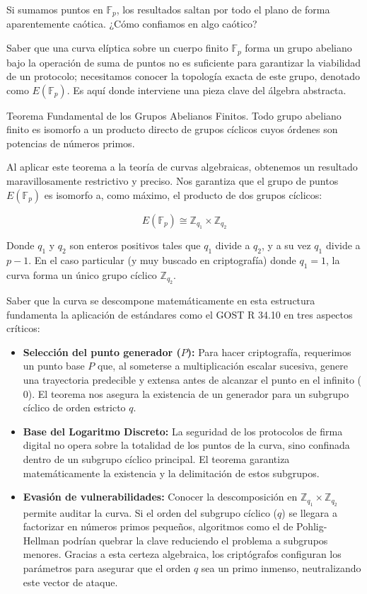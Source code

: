 Si sumamos puntos en $\mathbb{F}_p$, los resultados saltan por todo el plano de forma aparentemente caótica. ¿Cómo confiamos en algo caótico?

Saber que una curva elíptica sobre un cuerpo finito $\mathbb{F}_p$ forma un grupo abeliano bajo la operación de suma de puntos no es suficiente para garantizar la viabilidad de un protocolo; necesitamos conocer la topología exacta de este grupo, denotado como $E(\mathbb{F}_p)$. Es aquí donde interviene una pieza clave del álgebra abstracta.

\begin{theorem} Teorema Fundamental de los Grupos Abelianos Finitos.
Todo grupo abeliano finito es isomorfo a un producto directo de grupos cíclicos cuyos órdenes son potencias de números primos.
\end{theorem}

Al aplicar este teorema a la teoría de curvas algebraicas, obtenemos un resultado maravillosamente restrictivo y preciso. Nos garantiza que el grupo de puntos $E(\mathbb{F}_p)$ es isomorfo a, como máximo, el producto de dos grupos cíclicos:

$$E(\mathbb{F}_p) \cong \mathbb{Z}_{q_1} \times \mathbb{Z}_{q_2}$$

Donde $q_1$ y $q_2$ son enteros positivos tales que $q_1$ divide a $q_2$, y a su vez $q_1$ divide a $p-1$. En el caso particular (y muy buscado en criptografía) donde $q_1 = 1$, la curva forma un único grupo cíclico $\mathbb{Z}_{q_2}$.

Saber que la curva se descompone matemáticamente en esta estructura fundamenta la aplicación de estándares como el GOST R 34.10 en tres aspectos críticos:

\begin{itemize}
    \item \textbf{Selección del punto generador ($P$):} Para hacer criptografía, requerimos un punto base $P$ que, al someterse a multiplicación escalar sucesiva, genere una trayectoria predecible y extensa antes de alcanzar el punto en el infinito ($0$). El teorema nos asegura la existencia de un generador para un subgrupo cíclico de orden estricto $q$.
    \item \textbf{Base del Logaritmo Discreto:} La seguridad de los protocolos de firma digital no opera sobre la totalidad de los puntos de la curva, sino confinada dentro de un subgrupo cíclico principal. El teorema garantiza matemáticamente la existencia y la delimitación de estos subgrupos.
    \item \textbf{Evasión de vulnerabilidades:} Conocer la descomposición en $\mathbb{Z}_{q_1} \times \mathbb{Z}_{q_2}$ permite auditar la curva. Si el orden del subgrupo cíclico ($q$) se llegara a factorizar en números primos pequeños, algoritmos como el de Pohlig-Hellman podrían quebrar la clave reduciendo el problema a subgrupos menores. Gracias a esta certeza algebraica, los criptógrafos configuran los parámetros para asegurar que el orden $q$ sea un primo inmenso, neutralizando este vector de ataque.
\end{itemize}

